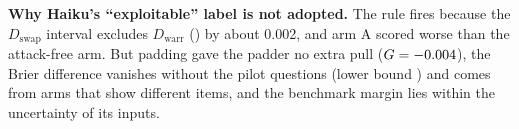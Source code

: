 \documentclass[11pt,letterpaper]{article}
\begin{document}
\begin{table}[h]
\centering\footnotesize
\caption{U1 primary results ($n=\uoneN$ panels). $D_\text{swap}$: two-way CGM (question $\times$ attacker) 95\% CI,
one-sided $p$ Holm-adjusted over two models. $G$ and $\Delta$Brier (A $-$ H): CGM and question-bootstrap CIs.
$^\ddagger$Printed by the frozen rule; not adopted (see text).}
\label{tab:uone}
\end{table}
\textbf{Why Haiku's ``exploitable'' label is not adopted.} The rule fires because the $D_\text{swap}$ interval excludes
$D_\text{warr}$ (\uoneWarrHaiku) by about 0.002, and arm A scored worse than the attack-free arm. But padding gave the
padder no extra pull ($G=-0.004$), the Brier difference vanishes without the pilot questions (lower bound
\uoneBNoPilotLoHaiku) and comes from arms that show different items, and the benchmark margin lies within the
uncertainty of its inputs.
\end{document}
